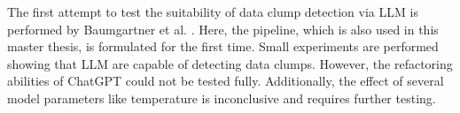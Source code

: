 The first attempt to test the suitability of data clump detection via \ac{LLM} is performed by Baumgartner et al. \cite{electronics13091644}. Here, the pipeline, which is also used in this master thesis, is formulated for the first time. Small experiments are performed showing that \ac{LLM} are capable of detecting data clumps. However, the refactoring abilities of ChatGPT could not be tested fully. Additionally, the effect of several model parameters like temperature is inconclusive and requires further testing. 